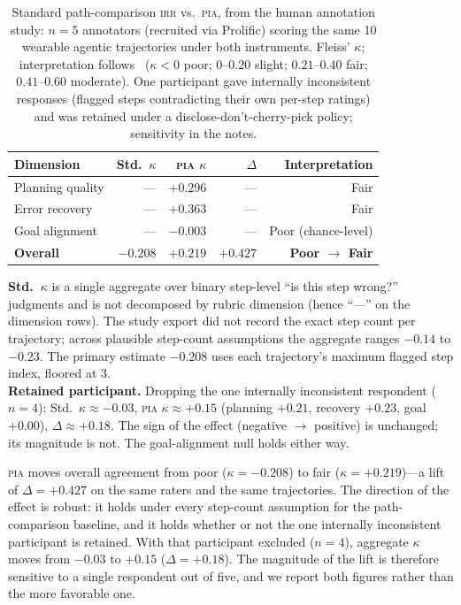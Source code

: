 \documentclass{article}
\newcommand{\PIA}{\textsc{pia}}          %
\begin{document}
\begin{table}[!t]
\centering
\caption{Standard path-comparison \textsc{irr} vs.\ \PIA{}, from the human
         annotation study: $n=5$ annotators (recruited via Prolific) scoring
         the same 10 wearable agentic trajectories under both instruments.
         Fleiss' $\kappa$; interpretation follows~\citet{fleiss1971}
         ($\kappa < 0$ poor; $0$--$0.20$ slight; $0.21$--$0.40$ fair;
         $0.41$--$0.60$ moderate). One participant gave internally
         inconsistent responses (flagged steps contradicting their own
         per-step ratings) and was retained under a disclose-don't-cherry-pick
         policy; sensitivity in the notes.}
\label{tab:pia}
\begin{tabular}{lrrrr}
\toprule
\textbf{Dimension} & \textbf{Std.\ $\kappa$} & \textbf{\PIA{} $\kappa$}
  & \textbf{$\Delta$} & \textbf{Interpretation} \\
\midrule
Planning quality   & ---      & $+0.296$ & ---      & Fair                \\
Error recovery     & ---      & $+0.363$ & ---      & Fair                \\
Goal alignment     & ---      & $-0.003$ & ---      & Poor (chance-level) \\
\midrule
\textbf{Overall}   & $-0.208$ & $+0.219$ & $+0.427$ & \textbf{Poor $\to$ Fair} \\
\bottomrule
\end{tabular}

\smallskip
{\footnotesize
\textbf{Std.\ $\kappa$} is a single aggregate over binary step-level
``is this step wrong?'' judgments and is not decomposed by rubric dimension
(hence ``---'' on the dimension rows). The study export did not record the
exact step count per trajectory; across plausible step-count assumptions the
aggregate ranges $-0.14$ to $-0.23$. The primary estimate $-0.208$ uses each
trajectory's maximum flagged step index, floored at 3.\\[2pt]
\textbf{Retained participant.} Dropping the one internally inconsistent
respondent ($n=4$): Std.\ $\kappa \approx -0.03$, \PIA{} $\kappa \approx +0.15$
(planning $+0.21$, recovery $+0.23$, goal $+0.00$), $\Delta \approx +0.18$.
The sign of the effect (negative $\to$ positive) is unchanged; its magnitude
is not. The goal-alignment null holds either way.
}
\end{table}

\PIA{} moves overall agreement from poor ($\kappa = -0.208$) to fair
($\kappa = +0.219$)---a lift of $\Delta = +0.427$ on the same raters and the
same trajectories. The direction of the effect is robust: it holds under
every step-count assumption for the path-comparison baseline, and it holds
whether or not the one internally inconsistent participant is retained. With
that participant excluded ($n=4$), aggregate $\kappa$ moves from $-0.03$ to
$+0.15$ ($\Delta = +0.18$). The magnitude of the lift is therefore sensitive
to a single respondent out of five, and we report both figures rather than
the more favorable one.
\end{document}
